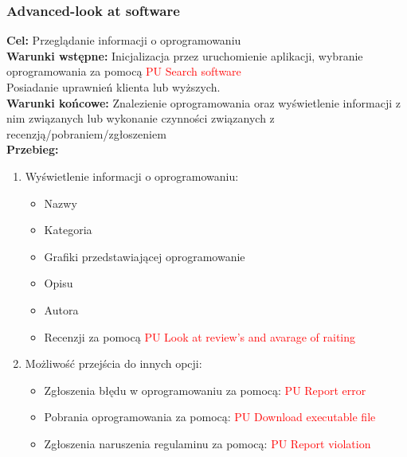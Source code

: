 \documentclass[12pt,a4paper]{article}
\begin{document}
\subsubsection{Advanced-look at software}
\textbf{Cel: } Przeglądanie informacji o oprogramowaniu \\
\textbf{Warunki wstępne:} Inicjalizacja przez uruchomienie aplikacji, wybranie oprogramowania za pomocą \textcolor{red}{PU Search software}\\ Posiadanie uprawnień klienta lub wyższych.\\
\textbf{Warunki końcowe:} Znalezienie oprogramowania oraz wyświetlenie informacji z nim związanych lub wykonanie czynności związanych z recenzją/pobraniem/zgłoszeniem \\
\textbf{Przebieg:}
\begin{enumerate}
    \item Wyświetlenie informacji o oprogramowaniu:
    \begin{itemize}
        \item Nazwy
        \item Kategoria
        \item Grafiki przedstawiającej oprogramowanie
        \item Opisu
        \item Autora
        \item Recenzji za pomocą \textcolor{red}{PU Look at review's and avarage of raiting}
    \end{itemize}
    \item Możliwość przejścia do innych opcji:
    \begin{itemize}
        \item Zgłoszenia błędu w oprogramowaniu za pomocą: \textcolor{red}{PU Report error}
        \item Pobrania oprogramowania za pomocą: \textcolor{red}{PU Download executable file}
        \item Zgłoszenia naruszenia regulaminu za pomocą: \textcolor{red}{PU Report violation}
    \end{itemize}
\end{enumerate}
\end{document}
